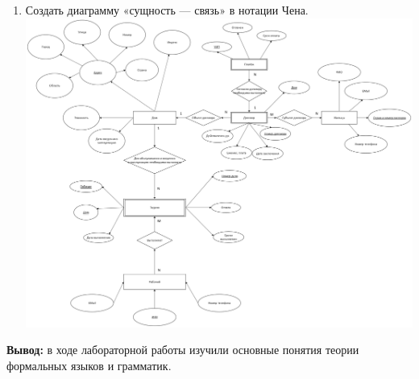\documentclass[a4paper,14pt]{extarticle}
\begin{document}
\begin{enumerate}[1.]
    \item Создать диаграмму «сущность — связь» в нотации Чена.\\
    \includegraphics[width=180mm]{db_task2}\\
\end{enumerate}

\textbf{Вывод: } в ходе лабораторной работы изучили основные понятия теории формальных языков и грамматик.
\end{document}
